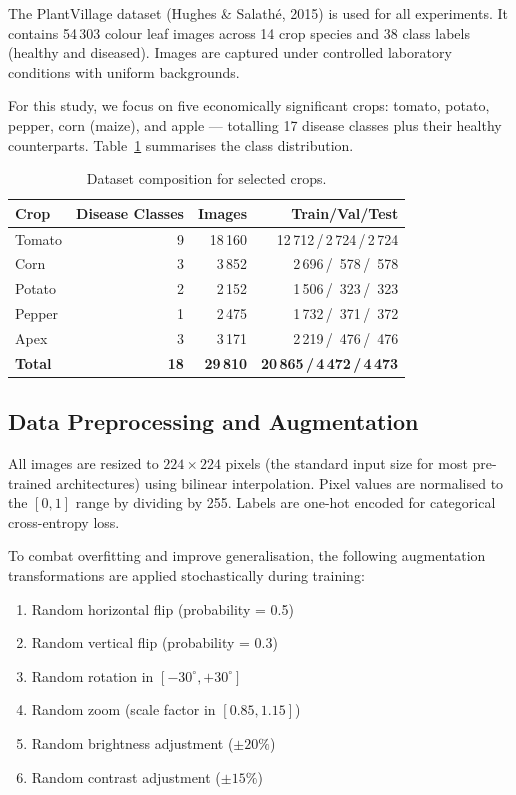 \documentclass[11pt,a4paper]{article}
\newcommand{\parsp}{\medskip}
\begin{document}
The PlantVillage dataset (Hughes \& Salathé, 2015) is used for all
experiments. It contains 54\,303 colour leaf images across 14 crop species
and 38 class labels (healthy and diseased). Images are captured under
controlled laboratory conditions with uniform backgrounds.

\parsp
For this study, we focus on five economically significant crops: tomato,
potato, pepper, corn (maize), and apple — totalling 17 disease classes plus
their healthy counterparts. Table~\ref{tab:dataset} summarises the class
distribution.

\begin{table}[H]
  \centering
  \caption{Dataset composition for selected crops.}
  \label{tab:dataset}
  \begin{tabular}{@{}lrrr@{}}
    \toprule
    \textbf{Crop}  & \textbf{Disease Classes} & \textbf{Images} & \textbf{Train/Val/Test} \\
    \midrule
    Tomato  & 9  & 18\,160 & 12\,712\,/\,2\,724\,/\,2\,724 \\
    Corn    & 3  &  3\,852 &  2\,696\,/\,  578\,/\,  578 \\
    Potato  & 2  &  2\,152 &  1\,506\,/\,  323\,/\,  323 \\
    Pepper  & 1  &  2\,475 &  1\,732\,/\,  371\,/\,  372 \\
    Apex   & 3  &  3\,171 &  2\,219\,/\,  476\,/\,  476 \\
    \midrule
    \textbf{Total} & \textbf{18} & \textbf{29\,810} & \textbf{20\,865\,/\,4\,472\,/\,4\,473} \\
    \bottomrule
  \end{tabular}
\end{table}

\subsection{Data Preprocessing and Augmentation}

All images are resized to $224 \times 224$ pixels (the standard input size
for most pre-trained architectures) using bilinear interpolation. Pixel
values are normalised to the $[0, 1]$ range by dividing by 255. Labels are
one-hot encoded for categorical cross-entropy loss.

\parsp
To combat overfitting and improve generalisation, the following augmentation
transformations are applied stochastically during training:

\begin{enumerate}[label=\textcolor{accent}{\textbullet}, leftmargin=2em, itemsep=3pt]
  \item Random horizontal flip (probability = 0.5)
  \item Random vertical flip (probability = 0.3)
  \item Random rotation in $[-30^\circ, +30^\circ]$
  \item Random zoom (scale factor in $[0.85, 1.15]$)
  \item Random brightness adjustment ($\pm 20\%$)
  \item Random contrast adjustment ($\pm 15\%$)
\end{enumerate}
\end{document}
